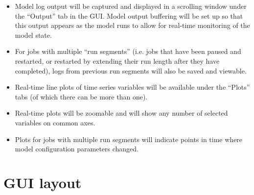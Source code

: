 \documentclass[a4paper,11pt,article]{memoir}
\begin{document}
\begin{itemize}
  \item{Model log output will be captured and displayed in a scrolling
    window under the ``Output'' tab in the GUI.  Model output
    buffering will be set up so that this output appears as the model
    runs to allow for real-time monitoring of the model state.}
  \item{For jobs with multiple ``run segments'' (i.e. jobs that have
    been paused and restarted, or restarted by extending their run
    length after they have completed), logs from previous run segments
    will also be saved and viewable.}
  \item{Real-time line plots of time series variables will be
    available under the ``Plots'' tabs (of which there can be more
    than one).}
  \item{Real-time plots will be zoomable and will show any number of
    selected variables on common axes.}
  \item{Plots for jobs with multiple run segments will indicate points
    in time where model configuration parameters changed.}
\end{itemize}


\chapter{GUI layout}
\end{document}
